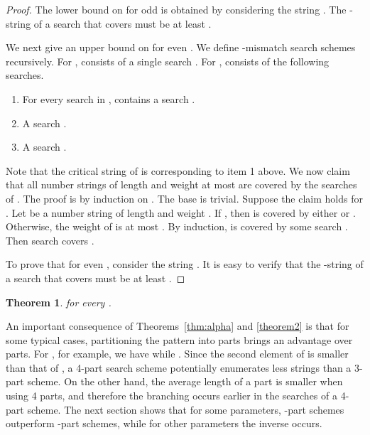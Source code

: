 \documentclass[12pt]{article}
\newtheorem{theorem}{Theorem}
\newif\iffull
\begin{document}
\begin{proof}
The lower bound on  for odd  is obtained by considering
the string . The -string of a search that covers 
must be at least .

We next give an upper bound on  for even .
We define -mismatch search schemes  recursively.
For ,  consists of a single search .
For ,  consists of the following searches.
\begin{enumerate}
\item For every search  in ,
 contains a search
.
\item A search
.
\item A search
.
\end{enumerate}
Note that the critical string of  is 
corresponding to item 1 above.
We now claim that all number strings of length  and weight at most 
are covered by the searches of .
The proof is by induction on .
The base  is trivial.
Suppose the claim holds for .
Let  be a number string of length  and weight .
If , then  is covered by either  or .
Otherwise, the weight of  is at most
.
By induction,
 is covered by some search
. Then search  covers .

To prove that  for even ,
consider the string .
It is easy to verify that the -string of a search that covers 
must be at least .
\end{proof}
\fi
\begin{theorem}\label{thm:alpha2}
 for every .
\label{theorem2}
\end{theorem}
\iffull
\begin{proof}
We first give an upper bound on .
We build a -mismatch search scheme  that contains
searches

for all  and .
Let  be a string of weight  and length .
By Lemma~\ref{lem:simple} there are indices  and  such that
, and therefore  is covered by
.

The lower bound is obtained from the string .
It is easy to verify that the -string of a search that covers 
must be at least .
\end{proof}
\fi

An important consequence of Theorems~\ref{thm:alpha} and
\ref{theorem2} is that for some typical cases, partitioning the pattern
into  parts brings an advantage over  parts. 
For , for example, we have  while .
Since the second element of  is smaller than that
of , a 4-part search scheme potentially enumerates
less strings than a 3-part scheme.
On the other hand, the average length of a part is smaller when using 4 parts,
and therefore the branching occurs earlier in the searches of a 4-part scheme.
The next section shows that for some parameters, -part schemes
outperform -part schemes,
while for other parameters the inverse occurs.
\end{document}
